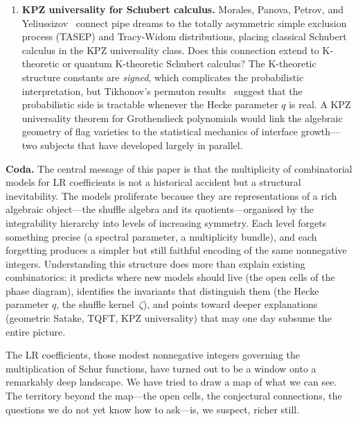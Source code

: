 \begin{enumerate}[label=\textbf{Q\arabic*.}, ref=Q\arabic*, leftmargin=3em]
\item \label{q:kpz}
\textbf{KPZ universality for Schubert calculus.}
Morales, Panova, Petrov, and
Yeliussizov~\cite{morales-panova-petrov-yeliussizov} connect pipe
dreams to the totally asymmetric simple exclusion process (TASEP) and
Tracy-Widom distributions, placing classical Schubert calculus in the
KPZ universality class.  Does this connection extend to K-theoretic or
quantum K-theoretic Schubert calculus?  The K-theoretic structure
constants are \emph{signed}, which complicates the probabilistic
interpretation, but Tikhonov's permuton results~\cite{tikhonov-2026}
suggest that the probabilistic side is tractable whenever the Hecke
parameter $q$ is real.  A KPZ universality theorem for Grothendieck
polynomials would link the algebraic geometry of flag varieties to the
statistical mechanics of interface growth---two subjects that have
developed largely in parallel.

\end{enumerate}

\bigskip

\noindent
\textbf{Coda.}\enspace
The central message of this paper is that the multiplicity of
combinatorial models for LR coefficients is not a historical accident
but a structural inevitability.  The models proliferate because they
are representations of a rich algebraic object---the shuffle algebra
and its quotients---organised by the integrability hierarchy into
levels of increasing symmetry.  Each level forgets something precise
(a spectral parameter, a multiplicity bundle), and each forgetting
produces a simpler but still faithful encoding of the same
nonnegative integers.  Understanding this structure does more than
explain existing combinatorics: it predicts where new models should
live (the open cells of the phase diagram), identifies the invariants
that distinguish them (the Hecke parameter $q$, the shuffle
kernel~$\zeta$), and points toward deeper explanations (geometric
Satake, TQFT, KPZ universality) that may one day subsume the entire
picture.

The LR coefficients, those modest nonnegative integers governing the
multiplication of Schur functions, have turned out to be a window onto
a remarkably deep landscape.  We have tried to draw a map of what we
can see.  The territory beyond the map---the open cells, the
conjectural connections, the questions we do not yet know how to
ask---is, we suspect, richer still.
